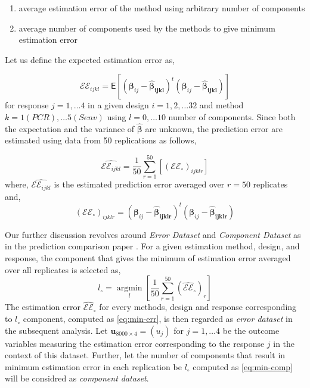 \documentclass[12pt,3p,authoryear]{elsarticle}
\providecommand{\tightlist}{%
  \setlength{\itemsep}{0pt}\setlength{\parskip}{0pt}}
\begin{document}
\begin{enumerate}
\def\labelenumi{\alph{enumi})}
\tightlist
\item
  average estimation error of the method using arbitrary number of components
\item
  average number of components used by the methods to give minimum estimation error
\end{enumerate}

Let us define the expected estimation error as,

\begin{equation}
\mathcal{EE}_{ijkl} =
  \mathsf{E}{\left[\left(\boldsymbol{\beta}_{ij} -
  \boldsymbol{\hat{\beta}_{ijkl}}\right)^t
  \left(\boldsymbol{\beta}_{ij} - \boldsymbol{\hat{\beta}_{ijkl}}\right)\right]}
\label{eq:est-error}
\end{equation}
for response \(j = 1, \ldots 4\) in a given design \(i=1, 2, \ldots 32\) and method \(k=1(PCR), \ldots 5(Senv)\) using \(l=0, \ldots 10\) number of components. Since both the expectation and the variance of \(\hat{\boldsymbol{\beta}}\) are unknown, the prediction error are estimated using data from 50 replications as follows,

\begin{equation}
\widehat{\mathcal{EE}_{ijkl}} =
  \frac{1}{50}\sum_{r=1}^{50}{\left[
  \left(\mathcal{EE}_\circ\right)_{ijklr}
  \right]}
\label{eq:estimated-est-error}
\end{equation}
where, \(\widehat{\mathcal{EE}_{ijkl}}\) is the estimated prediction error averaged over \(r=50\) replicates and,
\[\left(\mathcal{EE}_\circ\right)_{ijklr} = \left(\boldsymbol{\beta}_{ij} -\boldsymbol{\hat{\beta}_{ijklr}}\right)^t\left(\boldsymbol{\beta}_{ij} - \boldsymbol{\hat{\beta}_{ijklr}}\right)\]

Our further discussion revolves around \emph{Error Dataset} and \emph{Component Dataset} as in the prediction comparison paper \citet{rimal2019pred}. For a given estimation method, design, and response, the component that gives the minimum of estimation error averaged over all replicates is selected as,
\begin{equation}
  l_\circ = \operatorname*{argmin}_{l}\left[\frac{1}{50}\sum_{r=1}^{50}{\left(\widehat{\mathcal{EE}}_\circ\right)_{r}}\right]
  \label{eq:min-err}
\end{equation}
The estimation error \(\widehat{\mathcal{EE}}_\circ\) for every methods, design and response corresponding to \(l_\circ\) component, computed as \eqref{eq:min-err}, is then regarded as \emph{error dataset} in the subsequent analysis. Let \(\mathbf{u}_{8000\times4}=(u_j)\) for \(j = 1, \ldots 4\) be the outcome variables measuring the estimation error corresponding to the response \(j\) in the context of this dataset. Further, let the number of components that result in minimum estimation error in each replication be \(l_\circ\) computed as \eqref{eq:min-comp} will be considred as \emph{component dataset}.
\end{document}
